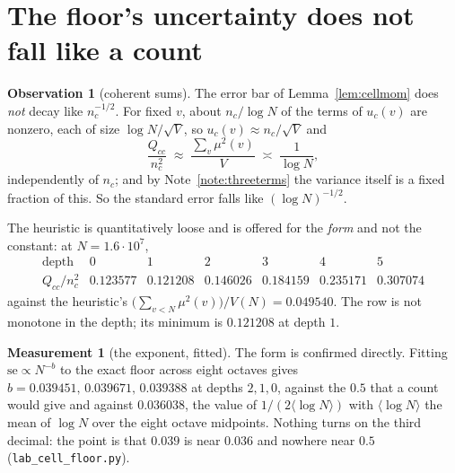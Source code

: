 \documentclass[11pt,a4paper]{article}
\theoremstyle{plain}
\theoremstyle{definition}
\newtheorem{observation}[theorem]{Observation}
\newtheorem{measurement}[theorem]{Measurement}
\theoremstyle{remark}
\begin{document}
\section{The floor's uncertainty does not fall like a count}%
\label{sec:coh}

\begin{observation}[coherent sums]\label{obs:coh}
The error bar of Lemma~\ref{lem:cellmom} does \emph{not} decay like
$n_c^{-1/2}$. For fixed $v$, about $n_c/\log N$ of the terms of
$u_c(v)$ are nonzero, each of size $\log N/\sqrt V$, so
$u_c(v)\approx n_c/\sqrt V$ and
\[
  \frac{Q_{cc}}{n_c^2}
  \;\approx\;\frac{\sum_v\mu^2(v)}{V}
  \;\asymp\;\frac{1}{\log N},
\]
independently of $n_c$; and by Note~\ref{note:threeterms} the variance
itself is a fixed fraction of this. So the standard error falls like
$(\log N)^{-1/2}$.
\end{observation}

The heuristic is quantitatively loose and is offered for the
\emph{form} and not the constant: at $N=1.6\cdot10^7$,
\[
\begin{array}{r|cccccc}
 \text{depth} & 0 & 1 & 2 & 3 & 4 & 5\\\hline
 Q_{cc}/n_c^2 & 0.123577 & 0.121208 & 0.146026 & 0.184159 & 0.235171
   & 0.307074
\end{array}
\]
against the heuristic's
$\bigl(\sum_{v<N}\mu^2(v)\bigr)/V(N)=0.049540$. The row is not
monotone in the depth; its minimum is $0.121208$ at depth $1$.

\begin{measurement}[the exponent, fitted]\label{meas:exponent}
The form is confirmed directly. Fitting $\mathrm{se}\propto N^{-b}$ to
the exact floor across eight octaves gives
$b=0.039451,\,0.039671,\,0.039388$ at depths $2,1,0$, against the
$0.5$ that a count would give and against $0.036038$, the value of
$1/(2\langle\log N\rangle)$ with $\langle\log N\rangle$ the mean of
$\log N$ over the eight octave midpoints. Nothing turns on the third
decimal: the point is that $0.039$ is near $0.036$ and nowhere near
$0.5$ (\texttt{lab\_cell\_floor.py}).
\end{measurement}
\end{document}
